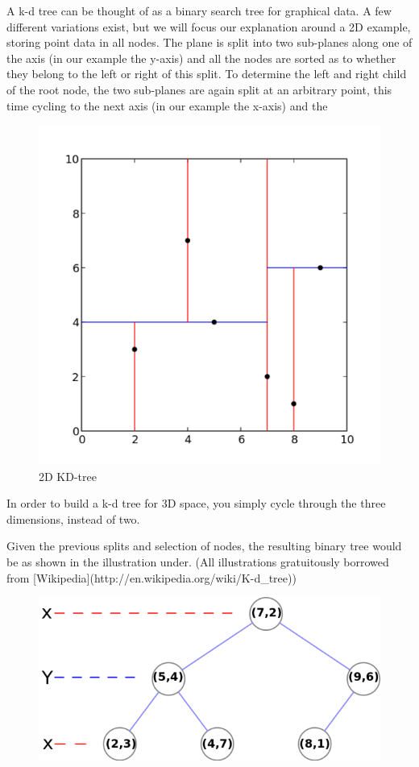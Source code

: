 \begin{enumerate}
\begin{enumerate}
A k-d tree can be thought of as a binary search tree for graphical data. A few different variations exist, but we will focus our explanation around a 2D example, storing point data in all nodes. The plane is split into two sub-planes along one of the axis (in our example the y-axis) and all the nodes are sorted as to whether they belong to the left or right of this split. To determine the left and right child of the root node, the two sub-planes are again split at an arbitrary point, this time cycling to the next axis (in our example the x-axis) and the

\begin{figure}[ht!]
\centering
\includegraphics[width=120mm]{gfx/Kdtree_2d.png}

\caption{2D KD-tree}
\label{fig:kdtree_2d}
\end{figure}

In order to build a k-d tree for 3D space, you simply cycle through the three dimensions, instead of two.

Given the previous splits and selection of nodes, the resulting binary tree would be as shown in the illustration under. (All illustrations gratuitously borrowed from [Wikipedia](http://en.wikipedia.org/wiki/K-d_tree))

\begin{figure}[ht!]
\centering
\includegraphics[width=120mm]{gfx/Tree_0001.png}


\end{figure}
\end{enumerate}
\end{enumerate}
